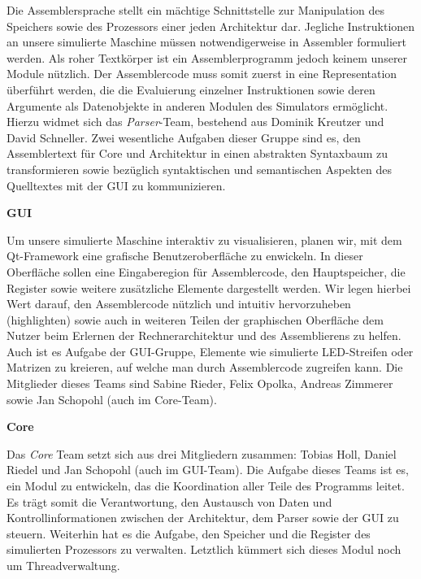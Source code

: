 Die Assemblersprache stellt ein mächtige Schnittstelle zur Manipulation des
Speichers sowie des Prozessors einer jeden Architektur dar. Jegliche
Instruktionen an unsere simulierte Maschine müssen notwendigerweise in Assembler
formuliert werden. Als roher Textkörper ist ein Assemblerprogramm jedoch keinem
unserer Module nützlich. Der Assemblercode muss somit zuerst in eine
Representation überführt werden, die die Evaluierung einzelner Instruktionen
sowie deren Argumente als Datenobjekte in anderen Modulen des Simulators
ermöglicht. Hierzu widmet sich das \emph{Parser}-Team, bestehend aus Dominik
Kreutzer und David Schneller. Zwei wesentliche Aufgaben dieser Gruppe sind es,
den Assemblertext für Core und Architektur in einen abstrakten Syntaxbaum zu
transformieren sowie bezüglich syntaktischen und semantischen Aspekten des Quelltextes
mit der GUI zu kommunizieren.

\textbf{GUI}

Um unsere simulierte Maschine interaktiv zu visualisieren, planen wir, mit dem
Qt-Framework eine grafische Benutzeroberfläche zu enwickeln. In dieser
Oberfläche sollen eine Eingaberegion für Assemblercode, den Hauptspeicher, die
Register sowie weitere zusätzliche Elemente dargestellt werden. Wir legen
hierbei Wert darauf, den Assemblercode nützlich und intuitiv hervorzuheben
(highlighten) sowie auch in weiteren Teilen der graphischen Oberfläche dem
Nutzer beim Erlernen der Rechnerarchitektur und des Assemblierens zu
helfen. Auch ist es Aufgabe der GUI-Gruppe, Elemente wie simulierte LED-Streifen
oder Matrizen zu kreieren, auf welche man durch Assemblercode zugreifen
kann. Die Mitglieder dieses Teams sind Sabine Rieder, Felix Opolka, Andreas
Zimmerer sowie Jan Schopohl (auch im Core-Team).

\textbf{Core}

Das \emph{Core} Team setzt sich aus drei Mitgliedern zusammen: Tobias Holl,
Daniel Riedel und Jan Schopohl (auch im GUI-Team). Die Aufgabe dieses Teams ist es, ein
Modul zu entwickeln, das die Koordination aller Teile des Programms leitet. Es
trägt somit die Verantwortung, den Austausch von Daten und Kontrollinformationen
zwischen der Architektur, dem Parser sowie der GUI zu steuern. Weiterhin hat
es die Aufgabe, den Speicher und die Register des simulierten Prozessors zu
verwalten. Letztlich kümmert sich dieses Modul noch um Threadverwaltung.
